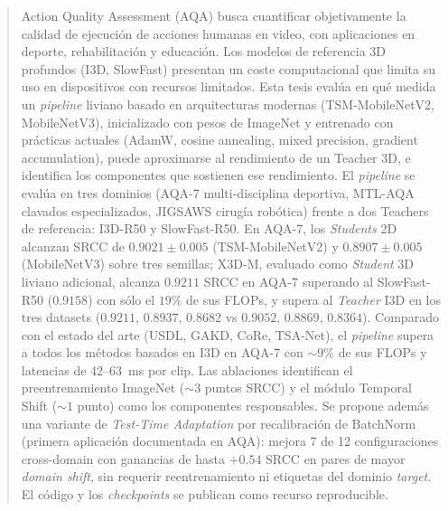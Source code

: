 \begin{abstract}
Action Quality Assessment (AQA) busca cuantificar objetivamente la calidad de ejecución de acciones humanas en video, con aplicaciones en deporte, rehabilitación y educación. Los modelos de referencia 3D profundos (I3D, SlowFast) presentan un coste computacional que limita su uso en dispositivos con recursos limitados. Esta tesis evalúa en qué medida un \textit{pipeline} liviano basado en arquitecturas modernas (TSM-MobileNetV2, MobileNetV3), inicializado con pesos de ImageNet y entrenado con prácticas actuales (AdamW, cosine annealing, mixed precision, gradient accumulation), puede aproximarse al rendimiento de un Teacher 3D, e identifica los componentes que sostienen ese rendimiento. El \textit{pipeline} se evalúa en tres dominios (AQA-7 multi-disciplina deportiva, MTL-AQA clavados especializados, JIGSAWS cirugía robótica) frente a dos Teachers de referencia: I3D-R50 y SlowFast-R50. En AQA-7, los \textit{Students} 2D alcanzan SRCC de $0.9021 \pm 0.005$ (TSM-MobileNetV2) y $0.8907 \pm 0.005$ (MobileNetV3) sobre tres semillas; X3D-M, evaluado como \textit{Student} 3D liviano adicional, alcanza $0.9211$ SRCC en AQA-7 superando al SlowFast-R50 ($0.9158$) con sólo el $19\%$ de sus FLOPs, y supera al \textit{Teacher} I3D en los tres datasets ($0.9211$, $0.8937$, $0.8682$ vs $0.9052$, $0.8869$, $0.8364$). Comparado con el estado del arte (USDL, GAKD, CoRe, TSA-Net), el \textit{pipeline} supera a todos los métodos basados en I3D en AQA-7 con $\sim 9\%$ de sus FLOPs y latencias de 42--63~ms por clip. Las ablaciones identifican el preentrenamiento ImageNet ($\sim 3$ puntos SRCC) y el módulo Temporal Shift ($\sim 1$ punto) como los componentes responsables. Se propone además una variante de \textit{Test-Time Adaptation} por recalibración de BatchNorm (primera aplicación documentada en AQA): mejora 7 de 12 configuraciones cross-domain con ganancias de hasta $+0.54$ SRCC en pares de mayor \textit{domain shift}, sin requerir reentrenamiento ni etiquetas del dominio \textit{target}. El código y los \textit{checkpoints} se publican como recurso reproducible.
\end{abstract}
